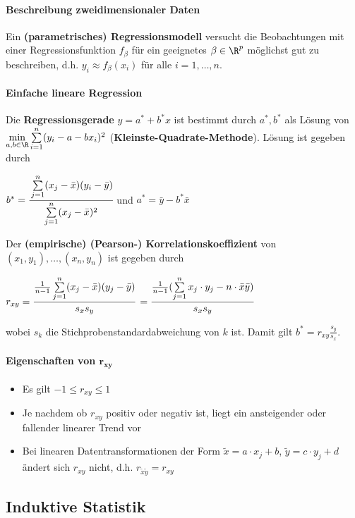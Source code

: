 \paragraph{Beschreibung zweidimensionaler Daten}
Ein \textbf{(parametrisches) Regressionsmodell} versucht die Beobachtungen mit einer Regressionsfunktion $f_\beta$ für ein geeignetes $\beta\in\R^p$ möglichst gut zu beschreiben, d.h. $y_i\approx f_\beta(x_i)$ für alle $i=1,\ldots,n$.

\paragraph{Einfache lineare Regression}
Die \textbf{Regressionsgerade} $y=a^*+b^*x$ ist bestimmt durch $a^*,b^*$ als Lösung von\\
$\min\limits_{a,b\in\R}\sum\limits_{i=1}^{n}(y_i-a-bx_i)^2$ (\textbf{Kleinste-Quadrate-Methode}).
Lösung ist gegeben durch
\begin{tightcenter}
	$b^*=\cfrac{\sum\limits_{j=1}^{n}(x_j-\bar{x})(y_i-\bar{y})}{\sum\limits_{j=1}^{n}(x_j-\bar{x})^2}$ \qquad und\qquad
	$a^*=\bar{y}-b^*\bar{x}$
\end{tightcenter}
Der \textbf{(empirische) (Pearson-) Korrelationskoeffizient} von $(x_1,y_1),\ldots,(x_n,y_n)$ ist gegeben durch
\begin{tightcenter}
	$r_{xy}=\cfrac{\frac{1}{n-1}\sum\limits_{j=1}^{n}(x_j-\bar{x})(y_j-\bar{y})}{s_xs_y}$
	$=\cfrac{\frac{1}{n-1}(\sum\limits_{j=1}^{n}x_j\cdot y_j-n\cdot\bar{x}\bar{y})}{s_xs_y}$
\end{tightcenter}
wobei $s_k$ die Stichprobenstandardabweichung von $k$ ist.
Damit gilt $b^*=r_{xy}\frac{s_y}{s_x}$.

\paragraph{Eigenschaften von $\boldsymbol{r_{xy}}$}
\begin{itemize}
	\item Es gilt $-1\leq r_{xy}\leq 1$
	\item Je nachdem ob $r_{xy}$ positiv oder negativ ist, liegt ein ansteigender oder fallender linearer Trend vor
	\item Bei linearen Datentransformationen der Form $\tilde{x}=a\cdot x_j+b$, $\tilde{y}=c\cdot y_j+d$ ändert sich $r_{xy}$ nicht, d.h. $r_{\tilde{x}\tilde{y}}=r_{xy}$
\end{itemize}

\subsection{Induktive Statistik}
